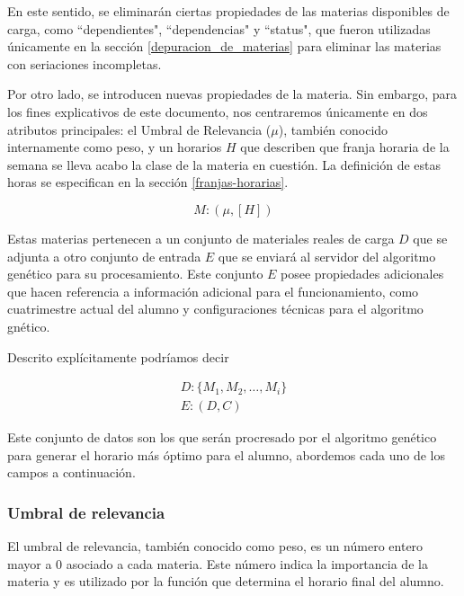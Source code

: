 En este sentido, se eliminarán ciertas propiedades de las materias disponibles de carga, como ``dependientes", ``dependencias" y ``status", que fueron utilizadas únicamente en la sección \ref{depuracion_de_materias} para eliminar las materias con seriaciones incompletas.

Por otro lado, se introducen nuevas propiedades de la materia. Sin embargo, para los fines explicativos de este documento, nos centraremos únicamente en dos atributos principales: el Umbral de Relevancia (\( \mu \)), también conocido internamente como peso, y un horarios \( H \) que describen que franja horaria de la semana se lleva acabo la clase de la materia en cuestión. La definición de estas horas se especifican en la sección \ref{franjas-horarias}.

\begin{equation}
    M: (\mu, [H])
    \label{definicion_de_materia_apta_para_procesamiento.}
\end{equation} 

Estas materias pertenecen a un conjunto de materiales reales de carga $D$ que se adjunta a otro conjunto de entrada $E$ que se enviará al servidor del algoritmo genético para su procesamiento. Este conjunto $E$ posee propiedades adicionales que hacen referencia a información adicional para el funcionamiento, como cuatrimestre actual del alumno y configuraciones técnicas para el algoritmo gnético.

Descrito explícitamente podríamos decir

\begin{gather*}
        D: \{ M_1, M_2, \dots, M_i \} \\
        E: (D, C)
    \label{definiciones_de_datos_de_entrada.}
\end{gather*} 

Este conjunto de datos son los que serán procresado por el algoritmo genético para generar el horario más óptimo para el alumno, abordemos cada uno de los campos a continuación.

\subsubsection{Umbral de relevancia}
\label{umbral_relevancia}
El umbral de relevancia, también conocido como peso, es un número entero mayor a 0 asociado a cada materia. Este número indica la importancia de la materia y es utilizado por la función que determina el horario final del alumno.

